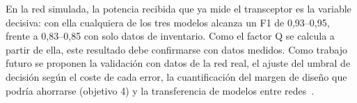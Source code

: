 \documentclass[runningheads]{llncs}
\begin{document}
En la red simulada, la potencia recibida que ya mide el transceptor es la variable decisiva: con ella cualquiera de los tres modelos alcanza un F1 de 0,93–0,95, frente a 0,83–0,85 con solo datos de inventario. Como el factor Q se calcula a partir de ella, este resultado debe confirmarse con datos medidos. Como trabajo futuro se proponen la validación con datos de la red real, el ajuste del umbral de decisión según el coste de cada error, la cuantificación del margen de diseño que podría ahorrarse (objetivo 4) y la transferencia de modelos entre redes~\cite{yu2019}.




\end{document}
